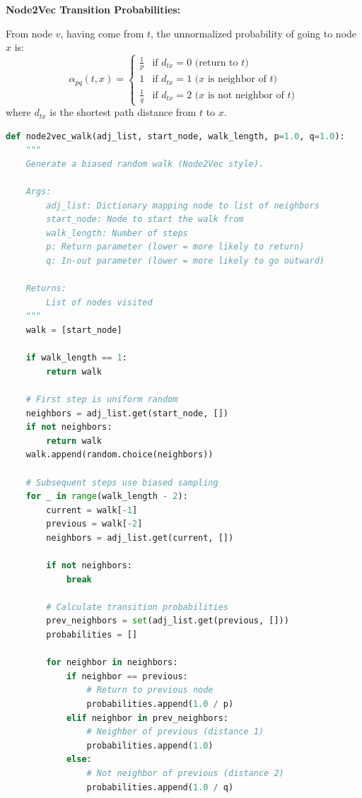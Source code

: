 \documentclass[12pt,a4paper]{article}
\begin{document}
\begin{mathbox}
\textbf{Node2Vec Transition Probabilities:}

From node $v$, having come from $t$, the unnormalized probability of going to node $x$ is:
\[
\alpha_{pq}(t, x) = \begin{cases}
\frac{1}{p} & \text{if } d_{tx} = 0 \text{ (return to } t\text{)} \\
1 & \text{if } d_{tx} = 1 \text{ (} x \text{ is neighbor of } t\text{)} \\
\frac{1}{q} & \text{if } d_{tx} = 2 \text{ (} x \text{ is not neighbor of } t\text{)}
\end{cases}
\]
where $d_{tx}$ is the shortest path distance from $t$ to $x$.
\end{mathbox}

\begin{lstlisting}[language=Python,caption={Node2Vec biased random walk}]
def node2vec_walk(adj_list, start_node, walk_length, p=1.0, q=1.0):
    """
    Generate a biased random walk (Node2Vec style).

    Args:
        adj_list: Dictionary mapping node to list of neighbors
        start_node: Node to start the walk from
        walk_length: Number of steps
        p: Return parameter (lower = more likely to return)
        q: In-out parameter (lower = more likely to go outward)

    Returns:
        List of nodes visited
    """
    walk = [start_node]

    if walk_length == 1:
        return walk

    # First step is uniform random
    neighbors = adj_list.get(start_node, [])
    if not neighbors:
        return walk
    walk.append(random.choice(neighbors))

    # Subsequent steps use biased sampling
    for _ in range(walk_length - 2):
        current = walk[-1]
        previous = walk[-2]
        neighbors = adj_list.get(current, [])

        if not neighbors:
            break

        # Calculate transition probabilities
        prev_neighbors = set(adj_list.get(previous, []))
        probabilities = []

        for neighbor in neighbors:
            if neighbor == previous:
                # Return to previous node
                probabilities.append(1.0 / p)
            elif neighbor in prev_neighbors:
                # Neighbor of previous (distance 1)
                probabilities.append(1.0)
            else:
                # Not neighbor of previous (distance 2)
                probabilities.append(1.0 / q)


\end{lstlisting}
\end{document}

